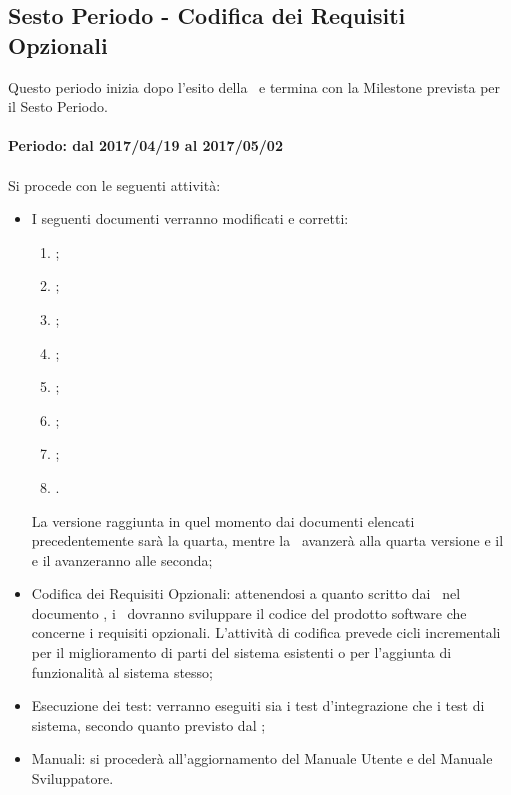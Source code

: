 \documentclass[../PianoDiProgetto_v3.0.0.tex]{subfiles}
\begin{document}
	\subsection{Sesto Periodo - Codifica dei Requisiti Opzionali}
	Questo periodo inizia dopo l'esito della \revisionediqualifica\ e termina con la Milestone prevista per il Sesto Periodo.
	\\
	\\
	\textbf{Periodo: dal 2017/04/19 al 2017/05/02}
	\\
	\\
	Si procede con le seguenti attività:
	\begin{itemize}
		\item I seguenti documenti verranno modificati e corretti:
			\begin{enumerate}
				\item \normediprogetto;
				\item \analisideirequisiti;
				\item \pianodiqualifica;
				\item \pianodiprogetto;
				\item {};
				\item \manualeutente;
				\item \manualesviluppatore;
				\item \glossario.
			\end{enumerate}

		La versione raggiunta in quel momento dai documenti elencati precedentemente sarà la quarta, mentre la \ avanzerà alla quarta versione e il \manualeutente e il \manualesviluppatore avanzeranno alle seconda;
		\item Codifica dei Requisiti Opzionali: attenendosi a quanto scritto dai \progettisti\ nel documento , i \programmatori\ dovranno sviluppare il codice del prodotto software che concerne i requisiti opzionali. L'attività di codifica prevede cicli incrementali per il miglioramento di parti del sistema esistenti o per l'aggiunta di funzionalità al sistema stesso;
		\item Esecuzione dei test: verranno eseguiti sia i test d'integrazione che i test di sistema, secondo quanto previsto dal \pianodiqualifica;
		\item Manuali: si procederà all'aggiornamento del Manuale Utente e del Manuale Sviluppatore.
	\end{itemize}
	
\end{document}
